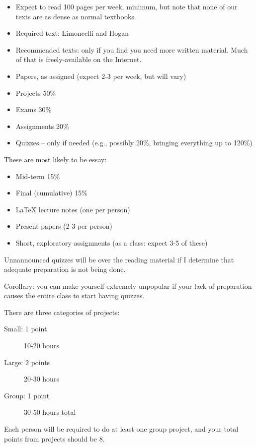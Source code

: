 \documentclass{slides}
\newcommand{\bi}{\begin{itemize}}
\newcommand{\ei}{\end{itemize}}
\newcommand{\bd}{\begin{description}}
\newcommand{\ed}{\end{description}}
\begin{document}

\bi
\item Expect to read 100 pages per week, minimum, but note
that none of our texts are as dense as normal textbooks.
\item Required text: Limoncelli and Hogan
\item Recommended texts: only if you find you need more
written material.  Much of that is freely-available on the Internet.
\item Papers, as assigned (expect 2-3 per week, but will vary)
\ei


\bi
\item Projects 50\%
\item Exams    30\%
\item Assignments 20\%
\item Quizzes -- only if needed (e.g., possibly 20\%, bringing
everything up to 120\%)
\ei


These are most likely to be essay:

\bi
\item Mid-term 15\%
\item Final (cumulative) 15\%
\ei


\bi
\item \LaTeX{} lecture notes (one per person)
\item Present papers (2-3 per person)
\item Short, exploratory assignments (as a class: expect 3-5 of these)
\ei


Unnannounced quizzes will be over the reading material if I determine 
that adequate preparation is not being done.

Corollary: you can make yourself extremely unpopular if your lack of
preparation causes the entire class to start having quizzes.


There are three categories of projects:

\bd
\item[Small: 1 point] 10-20 hours
\item[Large: 2 points] 20-30 hours
\item[Group: 1 point] 30-50 hours total
\ed

Each person will be required to do at least one group project, and your
total points from projects should be 8.
\end{document}
